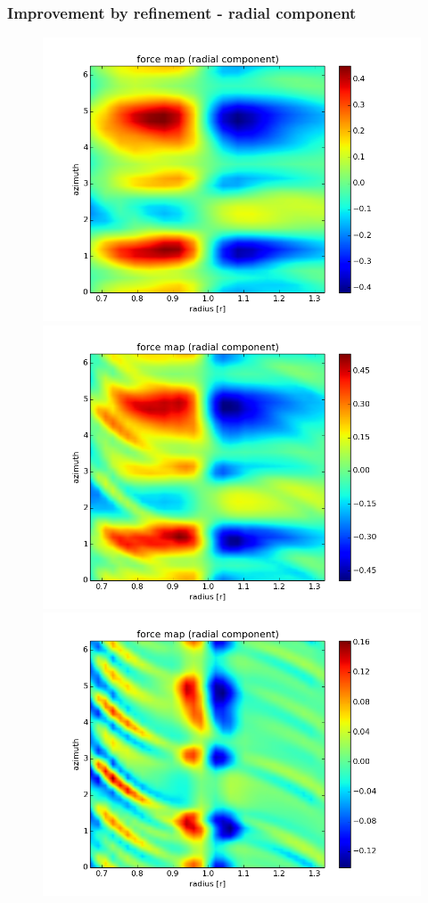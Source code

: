 \documentclass{beamer}
\begin{document}
\begin{frame}
 \frametitle{Improvement by refinement - radial component}
 \begin{figure}[H]
  \centering
  \includegraphics[width=.4\textwidth]{radial_pure_lvl3.png} \includegraphics[width=.4\textwidth]{radial_refined_lvl3.png} \\
  \includegraphics[width=.4\textwidth]{radial_puretorefined_diff3.png}
\end{figure}
\end{frame}
\end{document}
